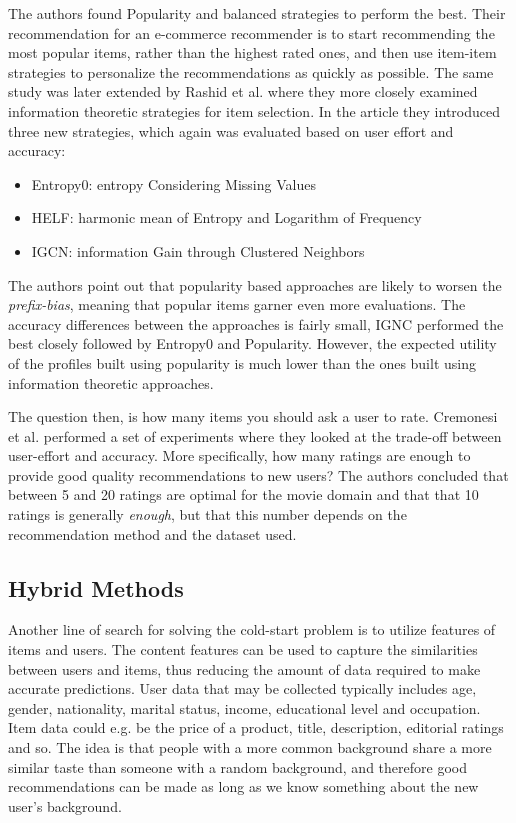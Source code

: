 The authors found Popularity and balanced strategies to perform the best. Their
recommendation for an e-commerce recommender is to start recommending the most
popular items, rather than the highest rated ones, and then use item-item
strategies to personalize the recommendations as quickly as possible. The same
study was later extended by Rashid et al. \cite{Rashid2008} where they more
closely examined information theoretic strategies for item selection. In the
article they introduced three new strategies, which again was evaluated based
on user effort and accuracy:

\begin{itemize}
\item Entropy0: entropy Considering Missing Values
\item HELF: harmonic mean of Entropy and Logarithm of Frequency
\item IGCN: information Gain through Clustered Neighbors
\end{itemize}

The authors point out that popularity based approaches are likely to worsen the
\emph{prefix-bias}, meaning that popular items garner even more evaluations.
The accuracy differences between the approaches is fairly small, IGNC performed
the best closely followed by Entropy0 and Popularity. However, the expected
utility of the profiles built using popularity is much lower than the ones built
using information theoretic approaches.\newline

The question then, is how many items you should ask a user to rate. Cremonesi
et al. \cite{Cremonesi2012} performed a set of experiments where they looked
at the trade-off between user-effort and accuracy. More specifically, how many
ratings are enough to provide good quality recommendations to new users? The
authors concluded that between 5 and 20 ratings are optimal for the movie
domain and that that 10 ratings is generally \emph{enough}, but that this number
depends on the recommendation method and the dataset used.

\subsection{Hybrid Methods}

Another line of search for solving the cold-start problem is to utilize
features of items and users. The content features can be used to capture the
similarities between users and items, thus reducing the amount of data required
to make accurate predictions. User data that may be collected typically
includes age, gender, nationality, marital status, income, educational level
and occupation. Item data could e.g. be the price of a product, title,
description, editorial ratings and so. The idea is that people with a more
common background share a more similar taste than someone with a random
background, and therefore good recommendations can be made as long as we know
something about the new user's background.

